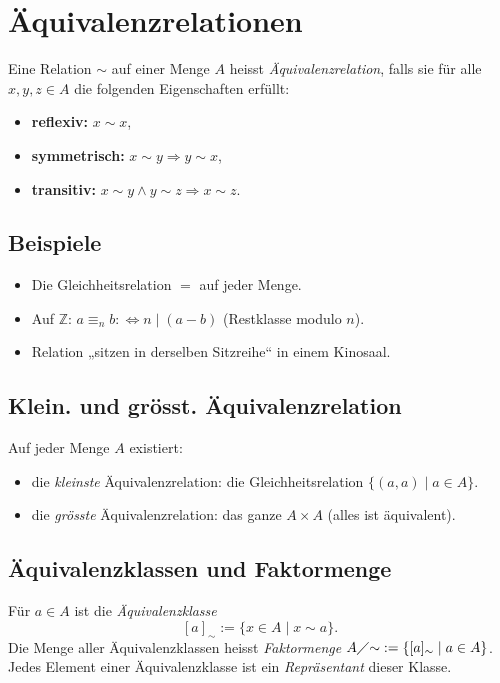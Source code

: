 \section{Äquivalenzrelationen}
Eine Relation $\sim$ auf einer Menge $A$ heisst \emph{Äquivalenzrelation}, falls sie für alle $x,y,z\in A$ die folgenden Eigenschaften erfüllt:
\begin{itemize}
  \item \textbf{reflexiv:} \quad $x\sim x$,
  \item \textbf{symmetrisch:} \quad $x\sim y \Rightarrow y\sim x$,
  \item \textbf{transitiv:} \quad $x\sim y \land y\sim z \Rightarrow x\sim z$.
\end{itemize}

\subsection{Beispiele}
\begin{itemize}
  \item Die Gleichheitsrelation $=$ auf jeder Menge.
  \item Auf $\mathbb{Z}$: $a\equiv_n b :\Leftrightarrow n\mid(a-b)$ (Restklasse modulo $n$).
  \item Relation „sitzen in derselben Sitzreihe“ in einem Kinosaal.
\end{itemize}

\subsection{Klein. und grösst. Äquivalenzrelation}
Auf jeder Menge \(A\) existiert:
\begin{itemize}[noitemsep]
  \item die \emph{kleinste} Äquivalenzrelation: die Gleichheitsrelation \(\{(a,a)\mid a\in A\}\).
  \item die \emph{grösste} Äquivalenzrelation: das ganze \(A\times A\) (alles ist äquivalent).
\end{itemize}

\subsection{Äquivalenzklassen und Faktormenge}
Für $a\in A$ ist die \emph{Äquivalenzklasse}
\[
[a]_\sim := \{x\in A \mid x\sim a\}.
\]
Die Menge aller Äquivalenzklassen heisst \emph{Faktormenge} $A\diagup{\sim} := \{[a]_\sim \mid a\in A\}$.
Jedes Element einer Äquivalenzklasse ist ein \emph{Repräsentant} dieser Klasse.


